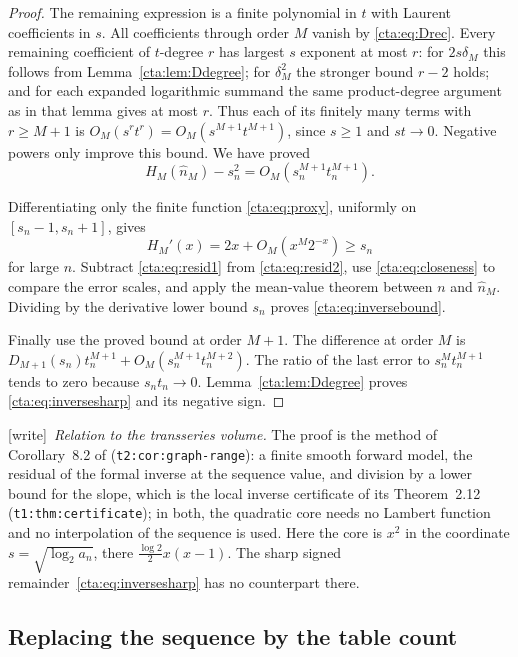 \documentclass[11pt]{article}
\theoremstyle{definition}
\theoremstyle{remark}
\newcommand{\wtag}{\textup{[write]}}
\begin{document}
\begin{proof}
The remaining expression is a finite polynomial in $t$ with Laurent
coefficients in $s$. All coefficients through order $M$ vanish by
\eqref{cta:eq:Drec}. Every remaining coefficient of $t$-degree $r$ has
largest $s$ exponent at most $r$: for $2s\delta_M$ this follows from
Lemma~\ref{cta:lem:Ddegree}; for $\delta_M^2$ the stronger bound $r-2$ holds;
and for each expanded logarithmic summand the same product-degree
argument as in that lemma gives at most $r$.
Thus each of its finitely many terms with $r\geq M+1$ is
$O_M(s^rt^r)=O_M(s^{M+1}t^{M+1})$, since $s\geq1$ and $st\to0$.
Negative powers only improve this bound. We have proved
\begin{equation}\label{cta:eq:resid2}
 H_M(\widehat n_M)-s_n^2
       =O_M(s_n^{M+1}t_n^{M+1}).
\end{equation}

Differentiating only the finite function \eqref{cta:eq:proxy}, uniformly on
$[s_n-1,s_n+1]$, gives
\[
 H_M'(x)=2x+O_M(x^M2^{-x})\geq s_n
\]
for large $n$. Subtract \eqref{cta:eq:resid1} from \eqref{cta:eq:resid2}, use
\eqref{cta:eq:closeness} to compare the error scales, and apply the mean-value
theorem between $n$ and $\widehat n_M$. Dividing by the derivative lower
bound $s_n$ proves \eqref{cta:eq:inversebound}.

Finally use the proved bound at order $M+1$. The difference at order $M$
is $D_{M+1}(s_n)t_n^{M+1}+O_M(s_n^{M+1}t_n^{M+2})$. The ratio of the
last error to $s_n^Mt_n^{M+1}$ tends to zero because $s_nt_n\to0$.
Lemma~\ref{cta:lem:Ddegree} proves \eqref{cta:eq:inversesharp} and its negative sign.
\end{proof}

\wtag\ \emph{Relation to the transseries volume.} The proof is the method
of Corollary~8.2 of \cite{cti} (\texttt{t2:cor:graph-range}): a finite
smooth forward model, the residual of the formal inverse at the sequence
value, and division by a lower bound for the slope, which is the local
inverse certificate of its Theorem~2.12 (\texttt{t1:thm:certificate}); in
both, the quadratic core needs no Lambert function and no interpolation of
the sequence is used. Here the core is $x^2$ in the coordinate
$s=\sqrt{\log_2a_n}$, there $\tfrac{\log2}2x(x-1)$. The sharp signed
remainder~\eqref{cta:eq:inversesharp} has no counterpart there.

\subsection{Replacing the sequence by the table count}
\end{document}

